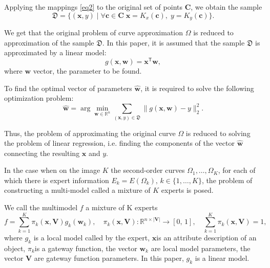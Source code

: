 Applying the mappings \eqref{eq2} to the original set of points $\mathbf {C} $, we obtain the sample
\[
\label{eq4}
    \mathfrak{D} = \{(\mathbf{x}, y) \; | \; \forall \mathbf{c} \in \mathbf{C} \; \mathbf{x} = K_x(\mathbf{c}), \; y = K_y(\mathbf{c}) \}.
\]

We get that the original problem of curve approximation $\Omega$ is reduced to approximation of the sample $\mathfrak {D}$. In this paper, it is assumed that the sample $\mathfrak {D}$ is approximated by a linear model:
\[
	g(\mathbf{x}, \mathbf{w}) = \mathbf{x}^\mathsf{T} \mathbf{w},
\] 
where $\mathbf{w}$ vector, the parameter to be found.

To find the optimal vector of parameters $\hat {\mathbf {w}}$, it is required to solve the following optimization problem:
\[
	\hat{\mathbf{w}} = \arg\min_{\mathbf{w}\in\mathbb{R}^n} \sum_{\left(\mathbf{x}, y\right) \in \mathfrak{D}}\|g(\mathbf{x}, \mathbf{w}) - y \|_2^2.
\] 

Thus, the problem of approximating the original curve $\Omega$ is reduced to solving the problem of linear regression, i.e. finding the components of the vector $\hat{\mathbf {w}}$ connecting the resulting $\mathbf {x}$ and $y$.

In the case when on the image $K$ the second-order curves  $\Omega_1, \dots, \Omega_K$, for each of which there is expert information $E_k = E (\Omega_k), \, k \in \{1, \dots , K\}$, the problem of constructing a multi-model called a mixture of $K$ experts is posed.
\begin{definition}
We call the multimodel $ f $ a mixture of K experts
\[
	f = \sum\limits_{k = 1}^{K}\pi_k(\mathbf{x}, \mathbf{V})g_k(\mathbf{w}_k),  \quad \pi_k(\mathbf{x}, \mathbf{V}): \mathbb{R}^{n\times |\mathbf{V}|} \rightarrow [0, \, 1], \quad \sum\limits_{k = 1}^{K}\pi_k(\mathbf{x}, \mathbf{V}) = 1, 
\]
where $g_k$ is a local model called by the expert, $\mathbf{x}$is an attribute description of an object, $\pi_k$is a gateway function, the vector $\mathbf{w}_k$ are local model parameters, the vector $\mathbf{V}$ are gateway function parameters. In this paper, $g_k$ is a linear model.
\end{definition}

